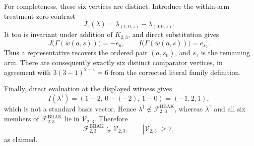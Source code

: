 For completeness, these six vertices are distinct. Introduce the within-arm treatment-zero contrast
\[
J_z(\lambda)=\lambda_{(1,0,z)}-\lambda_{(0,0,z)}.
\]
It too is invariant under addition of \(K_{2,3}\), and direct substitution gives
\[
J\bigl(\Gamma(\bar w(a,s))\bigr)=-e_a,\qquad I\bigl(\Gamma(\bar w(a,s))\bigr)=e_{s_0}.
\]
Thus a representative recovers the ordered pair \((a,s_0)\), and \(s_1\) is the remaining arm. There are consequently exactly six distinct comparator vertices, in agreement with \(3(3-1)^{2-1}=6\) from the corrected literal family definition.

Finally, direct evaluation at the displayed witness gives
\[
I(\lambda^\dagger)=(1-2,\,0-(-2),\,1-0)=(-1,2,1),
\]
which is not a standard basis vector. Hence \(\lambda^\dagger\notin\mathcal F^{\mathrm{BBAK}}_{2,3}\), whereas \(\lambda^\dagger\) and all six members of \(\mathcal F^{\mathrm{BBAK}}_{2,3}\) lie in \(\mathcal V_{2,3}\). Therefore
\[
\mathcal F^{\mathrm{BBAK}}_{2,3}\subsetneq\mathcal V_{2,3},\qquad |\mathcal V_{2,3}|\ge 7,
\]
as claimed.